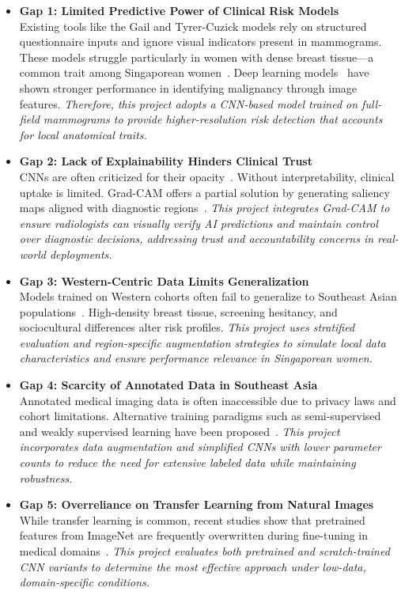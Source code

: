 \documentclass[12pt]{article}
\begin{document}
\begin{itemize}
    \item \textbf{Gap 1: Limited Predictive Power of Clinical Risk Models}\\
    Existing tools like the Gail and Tyrer-Cuzick models rely on structured questionnaire inputs and ignore visual indicators present in mammograms. These models struggle particularly in women with dense breast tissue—a common trait among Singaporean women~\cite{6}. Deep learning models~\cite{1,7} have shown stronger performance in identifying malignancy through image features. \textit{Therefore, this project adopts a CNN-based model trained on full-field mammograms to provide higher-resolution risk detection that accounts for local anatomical traits.}

    \item \textbf{Gap 2: Lack of Explainability Hinders Clinical Trust}\\
    CNNs are often criticized for their opacity~\cite{3,5}. Without interpretability, clinical uptake is limited. Grad-CAM offers a partial solution by generating saliency maps aligned with diagnostic regions~\cite{5}. \textit{This project integrates Grad-CAM to ensure radiologists can visually verify AI predictions and maintain control over diagnostic decisions, addressing trust and accountability concerns in real-world deployments.}

    \item \textbf{Gap 3: Western-Centric Data Limits Generalization}\\
    Models trained on Western cohorts often fail to generalize to Southeast Asian populations~\cite{6}. High-density breast tissue, screening hesitancy, and sociocultural differences alter risk profiles. \textit{This project uses stratified evaluation and region-specific augmentation strategies to simulate local data characteristics and ensure performance relevance in Singaporean women.}

    \item \textbf{Gap 4: Scarcity of Annotated Data in Southeast Asia}\\
    Annotated medical imaging data is often inaccessible due to privacy laws and cohort limitations. Alternative training paradigms such as semi-supervised and weakly supervised learning have been proposed~\cite{4}. \textit{This project incorporates data augmentation and simplified CNNs with lower parameter counts to reduce the need for extensive labeled data while maintaining robustness.}

    \item \textbf{Gap 5: Overreliance on Transfer Learning from Natural Images}\\
    While transfer learning is common, recent studies show that pretrained features from ImageNet are frequently overwritten during fine-tuning in medical domains~\cite{2}. \textit{This project evaluates both pretrained and scratch-trained CNN variants to determine the most effective approach under low-data, domain-specific conditions.}
\end{itemize}
\end{document}

